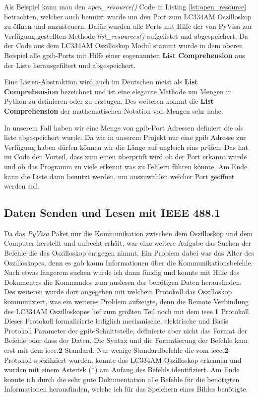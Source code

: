 
Als Beispiel kann man den \textit{open\_resource()} Code in Listing \ref{lst:open_resource} 
betrachten, welcher auch benutzt wurde um den Port zum LC334AM Oszilloskop zu öffnen und 
anzusteuern. Dafür wurden alle Ports mit Hilfe der von PyVisa zur Verfügung gestellten Methode 
\textit{list\_resources()} aufgelistet und abgespeichert. 
Da der Code aus dem LC334AM Oszilloskop Modul stammt wurde in dem oberen Beispiel alle 
\ac{gpib}-Ports mit Hilfe einer sogenannten \textbf{List Comprehension} aus der Liste 
herausgefiltert und abgespeichert. 

Eine Listen-Abstraktion wird auch im Deutschen meist als \textbf{List Comprehension} bezeichnet 
und ist eine elegante Methode um Mengen in Python zu definieren oder zu erzeugen. Des weiteren 
kommt die \textbf{List Comprehension} der mathematischen Notation von Mengen sehr nahe. 

In unserem Fall haben wir eine Menge von \ac{gpib}-Port Adressen definiert die als liste 
abgespeichert wurde. Da wir in unserem Projekt nur eine \ac{gpib} Adresse zur Verfügung haben 
dürfen können wir die Länge auf ungleich eins prüfen. Das hat im Code den Vorteil, dass zum 
einen überprüft wird ob der Port erkannt wurde und ob das Programm zu viele erkennt was zu 
Fehlern führen könnte. Am Ende kann die Liste dann benutzt werden, um auszuwählen welcher Port 
geöffnet werden soll. 

\subsection{Daten Senden und Lesen mit IEEE 488.1}
\label{subsec:send_receive}

Da das \textit{PyVisa} Paket nur die Kommunikation zwischen dem Oszilloskop und dem Computer herstellt und aufrecht erhält, war eine weitere Aufgabe das Suchen der Befehle die das Oszilloskop entgegen nimmt. Ein Problem dabei war das Alter des Oszilloskopes, denn es gab kaum Informationen über die Kommunikationsbefehle. Nach etwas längerem suchen wurde ich dann fündig und konnte mit Hilfe des Dokumentes  die Kommandos zum auslesen der benötigen Daten herausfinden. Des weiteren wurde dort angegeben mit welchem Protokoll das Oszilloskop kommuniziert, was ein weiteres Problem aufzeigte, denn die Remote Verbindung des LC334AM Oszilloskopes lief zum größten Teil noch mit dem \ac{ieee}.\textbf{1} Protokoll. Dieses Protokoll formalisierte lediglich mechanische, elektrische und Basis Protokoll Parameter der \ac{gpib}-Schnittstelle, definierte aber nicht das Format der Befehle oder dass der Daten. Die Syntax und die Formatierung der Befehle kam erst mit dem \ac{ieee}.\textbf{2} Standard. Nur wenige Standardbefehle die vom \ac{ieee}.\textbf{2}-Protokoll spezifiziert wurden, konnte das LC334AM Oszilloskop erkennen und wurden mit einem Asterisk (*) am Anfang des Befehls identifiziert. Am Ende konnte ich durch die sehr gute Dokumentation alle Befehle für die benötigten Informationen herausfinden, welche ich für das Speichern eines Bildes benötigte.


